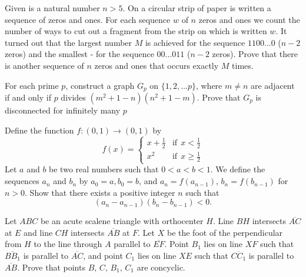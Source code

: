 \documentclass[11pt]{scrartcl}
\begin{document}
\begin{problem}[314213229221479]
	Given is a natural number $n > 5$. On a circular strip of paper is written a sequence of zeros and ones. For each sequence $w$ of $n$ zeros and ones we count the number of ways to cut out a fragment from the strip on which is written $w$. It turned out that the largest number $M$ is achieved for the sequence $11 00...0$ ($n-2$ zeros) and the smallest - for the sequence $00...011$ ($n-2$ zeros). Prove that there is another sequence of $n$ zeros and ones that occurs exactly $M$ times.
\end{problem}
\begin{problem}[409146991986056]
For each prime $p$, construct a graph $G_p$ on $\{1,2,\ldots p\}$, where $m\neq n$ are adjacent if and only if $p$ divides $(m^{2} + 1-n)(n^{2} + 1-m)$. Prove that $G_p$ is disconnected for infinitely many $p$
\end{problem}
\begin{problem}[8765929309402693604]
	Define the function $f:(0,1)\to (0,1)$ by\[\displaystyle f(x) = \left\{ \begin{array}{lr} x+\frac 12 & \text{if}\ \  x < \frac 12\\ x^2 & \text{if}\ \  x \ge \frac 12 \end{array} \right.\]Let $a$ and $b$ be two real numbers such that $0 < a < b < 1$. We define the sequences $a_n$ and $b_n$ by $a_0 = a, b_0 = b$, and $a_n = f( a_{n -1})$, $b_n = f (b_{n -1} )$ for $n > 0$. Show that there exists a positive integer $n$ such that\[(a_n - a_{n-1})(b_n-b_{n-1})<0.\]
\end{problem}
\begin{problem}[15595788767204175]
Let \(ABC\) be an acute scalene triangle with orthocenter \(H\). Line \(BH\) intersects \(\overline{AC}\) at \(E\) and line \(CH\) intersects \(\overline{AB}\) at \(F\). Let \(X\) be the foot of the perpendicular from \(H\) to the line through \(A\) parallel to \(\overline{EF}\). Point \(B_1\) lies on line \(XF\) such that \(\overline{BB_1}\) is parallel to \(\overline{AC}\), and point \(C_1\) lies on line \(XE\) such that \(\overline{CC_1}\) is parallel to \(\overline{AB}\). Prove that points \(B\), \(C\), \(B_1\), \(C_1\) are concyclic.
\end{problem}
\end{document}
